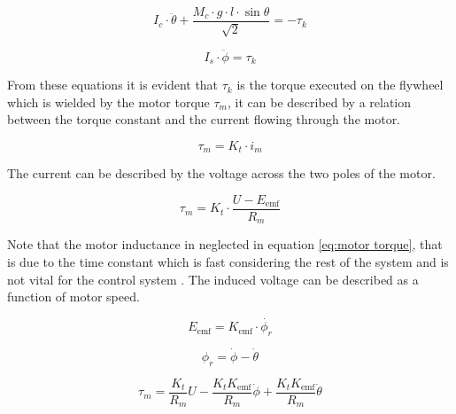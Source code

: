 \documentclass[a4paper,11pt]{kth-mag}
\begin{document}
\begin{equation} \label{eq:negativeL2}
I_c \cdot \ddot{\theta} + \frac{M_c \cdot g \cdot l \cdot \sin \theta }{\sqrt{2}}  = -\tau_k
\end{equation}

\begin{equation} \label{eq:postiveL2}
I_s \cdot \ddot{\phi} = \tau_k
\end{equation}

From these equations it is evident that $\tau_k$ is the torque executed on the flywheel which is wielded by the motor torque $\tau_m$, it can be described by a relation between the torque constant and the current flowing through the motor.

\begin{equation}
\tau_m = K_t \cdot i_m
\end{equation}

The current can be described by the voltage across the two poles of the motor.

\begin{equation} \label{eq:motor torque}
\tau_m = K_t \cdot \frac{U-E_{\text{emf}} }{R_m}
\end{equation}

Note that the motor inductance in neglected in equation \eqref{eq:motor torque}, that is due to the time constant which is fast considering the rest of the system and is not vital for the control system \cite{KTHpendulum}.
The induced voltage can be described as a function of motor speed.

\begin{equation}
E_{\text{emf}} = K_{\text{emf}} \cdot \dot{\phi_r}
\end{equation}

\begin{equation}
\phi_r = \dot{\phi} - \dot{\theta}
\end{equation}
 
\begin{equation} \label{eq:tau}
\tau_m = \frac{K_t}{R_m} U - \frac{K_t K_{\text{emf}} }{R_m} \dot{\phi} + \frac{K_t K_{\text{emf}} }{R_m} \dot{\theta}
\end{equation}
\end{document}
